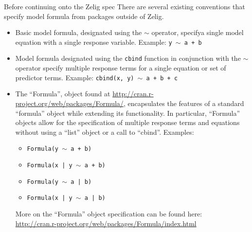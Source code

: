 \documentclass{article}
\newcommand{\tweedly}[0]{$\sim${ }}
\begin{document}
Before continuing onto the Zelig spec
There are several existing conventions that specify model formula from packages
outside of Zelig.

\begin{itemize}

  \item Basic model formula, designated using the \tweedly operator, specifya single
    model equation with a single response variable. Example: 
    {\tt y \tweedly a + b}

  \item Model formula designated using the \verb+cbind+ function in conjunction
    with the \tweedly operator specify multiple response terms for a single
    equation or set of predictor terms. Example: 
    {\tt cbind(x, y) \tweedly a + b + c}

  \item The ``Formula'', object found at
    \url{http://cran.r-project.org/web/packages/Formula/}, encapsulates the
    features of a standard ``formula'' object while extending its functionality.
    In particular, ``Formula'' objects allow for the specification of multiple
    response terms and equations without using a ``list'' object or a call to
    ``cbind''. Examples:
    \begin{itemize}
      \item {\tt Formula(y \tweedly a + b)}
      \item {\tt Formula(x | y \tweedly a + b)}
      \item {\tt Formula(y \tweedly a | b)}
      \item {\tt Formula(x | y \tweedly a | b)}
   \end{itemize}

   More on the ``Formula'' object specification can be found here:\\
   \url{http://cran.r-project.org/web/packages/Formula/index.html}

\end{itemize}
\end{document}
